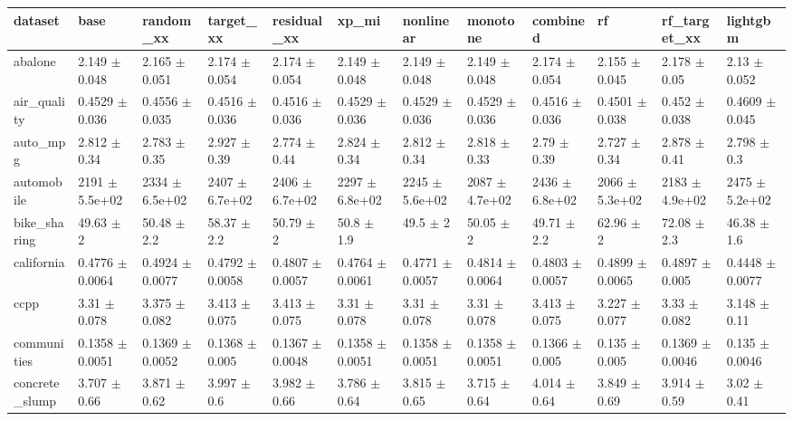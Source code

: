\begin{tabular}{llllllllllll}
\toprule
dataset & base & random\_xx & target\_xx & residual\_xx & xp\_mi & nonlinear & monotone & combined & rf & rf\_target\_xx & lightgbm \\
\midrule
abalone & 2.149 $\pm$ 0.048 & 2.165 $\pm$ 0.051 & 2.174 $\pm$ 0.054 & 2.174 $\pm$ 0.054 & 2.149 $\pm$ 0.048 & 2.149 $\pm$ 0.048 & 2.149 $\pm$ 0.048 & 2.174 $\pm$ 0.054 & 2.155 $\pm$ 0.045 & 2.178 $\pm$ 0.05 & 2.13 $\pm$ 0.052 \\
air\_quality & 0.4529 $\pm$ 0.036 & 0.4556 $\pm$ 0.035 & 0.4516 $\pm$ 0.036 & 0.4516 $\pm$ 0.036 & 0.4529 $\pm$ 0.036 & 0.4529 $\pm$ 0.036 & 0.4529 $\pm$ 0.036 & 0.4516 $\pm$ 0.036 & 0.4501 $\pm$ 0.038 & 0.452 $\pm$ 0.038 & 0.4609 $\pm$ 0.045 \\
auto\_mpg & 2.812 $\pm$ 0.34 & 2.783 $\pm$ 0.35 & 2.927 $\pm$ 0.39 & 2.774 $\pm$ 0.44 & 2.824 $\pm$ 0.34 & 2.812 $\pm$ 0.34 & 2.818 $\pm$ 0.33 & 2.79 $\pm$ 0.39 & 2.727 $\pm$ 0.34 & 2.878 $\pm$ 0.41 & 2.798 $\pm$ 0.3 \\
automobile & 2191 $\pm$ 5.5e+02 & 2334 $\pm$ 6.5e+02 & 2407 $\pm$ 6.7e+02 & 2406 $\pm$ 6.7e+02 & 2297 $\pm$ 6.8e+02 & 2245 $\pm$ 5.6e+02 & 2087 $\pm$ 4.7e+02 & 2436 $\pm$ 6.8e+02 & 2066 $\pm$ 5.3e+02 & 2183 $\pm$ 4.9e+02 & 2475 $\pm$ 5.2e+02 \\
bike\_sharing & 49.63 $\pm$ 2 & 50.48 $\pm$ 2.2 & 58.37 $\pm$ 2.2 & 50.79 $\pm$ 2 & 50.8 $\pm$ 1.9 & 49.5 $\pm$ 2 & 50.05 $\pm$ 2 & 49.71 $\pm$ 2.2 & 62.96 $\pm$ 2 & 72.08 $\pm$ 2.3 & 46.38 $\pm$ 1.6 \\
california & 0.4776 $\pm$ 0.0064 & 0.4924 $\pm$ 0.0077 & 0.4792 $\pm$ 0.0058 & 0.4807 $\pm$ 0.0057 & 0.4764 $\pm$ 0.0061 & 0.4771 $\pm$ 0.0057 & 0.4814 $\pm$ 0.0064 & 0.4803 $\pm$ 0.0057 & 0.4899 $\pm$ 0.0065 & 0.4897 $\pm$ 0.005 & 0.4448 $\pm$ 0.0077 \\
ccpp & 3.31 $\pm$ 0.078 & 3.375 $\pm$ 0.082 & 3.413 $\pm$ 0.075 & 3.413 $\pm$ 0.075 & 3.31 $\pm$ 0.078 & 3.31 $\pm$ 0.078 & 3.31 $\pm$ 0.078 & 3.413 $\pm$ 0.075 & 3.227 $\pm$ 0.077 & 3.33 $\pm$ 0.082 & 3.148 $\pm$ 0.11 \\
communities & 0.1358 $\pm$ 0.0051 & 0.1369 $\pm$ 0.0052 & 0.1368 $\pm$ 0.005 & 0.1367 $\pm$ 0.0048 & 0.1358 $\pm$ 0.0051 & 0.1358 $\pm$ 0.0051 & 0.1358 $\pm$ 0.0051 & 0.1366 $\pm$ 0.005 & 0.135 $\pm$ 0.005 & 0.1369 $\pm$ 0.0046 & 0.135 $\pm$ 0.0046 \\
concrete\_slump & 3.707 $\pm$ 0.66 & 3.871 $\pm$ 0.62 & 3.997 $\pm$ 0.6 & 3.982 $\pm$ 0.66 & 3.786 $\pm$ 0.64 & 3.815 $\pm$ 0.65 & 3.715 $\pm$ 0.64 & 4.014 $\pm$ 0.64 & 3.849 $\pm$ 0.69 & 3.914 $\pm$ 0.59 & 3.02 $\pm$ 0.41 \\

\end{tabular}
